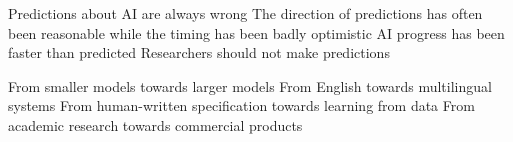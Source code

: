 \documentclass[11pt,a4paper]{article}
\begin{document}
\begin{questions}
  {Predictions about AI are always wrong}
  {The direction of predictions has often been reasonable while the timing has been badly optimistic}
  {AI progress has been faster than predicted}
  {Researchers should not make predictions}

  {From smaller models towards larger models}
  {From English towards multilingual systems}
  {From human-written specification towards learning from data}
  {From academic research towards commercial products}

\end{questions}
\end{document}
